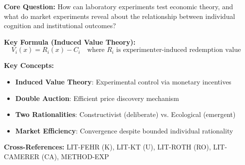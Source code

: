 \begin{abstract}
Vernon Smith (Nobel Prize 2002) pioneered experimental economics as a rigorous
methodology for testing economic theory. This appendix integrates his 60+ years
of research on market experiments, induced value theory, asset bubbles, and the
two-rationalities framework (constructivist vs. ecological) into EBF. Smith's
work provides the methodological foundation for laboratory validation of behavioral
predictions and demonstrates how market institutions generate emergent efficiency
even when individual rationality is limited.
\end{abstract}

\begin{tcolorbox}[colback=blue!5!white, colframe=blue!75!black,
    title=Quick Reference: LIT-SMITH]

\textbf{Core Question:} How can laboratory experiments test economic theory, and
what do market experiments reveal about the relationship between individual
cognition and institutional outcomes?

\textbf{Key Formula (Induced Value Theory):}
\begin{equation}
V_i(x) = R_i(x) - C_i \quad \text{where } R_i \text{ is experimenter-induced redemption value}
\label{eq:vs-induced-value}
\end{equation}

\textbf{Key Concepts:}
\begin{itemize}[nosep]
\item \textbf{Induced Value Theory}: Experimental control via monetary incentives
\item \textbf{Double Auction}: Efficient price discovery mechanism
\item \textbf{Two Rationalities}: Constructivist (deliberate) vs. Ecological (emergent)
\item \textbf{Market Efficiency}: Convergence despite bounded individual rationality
\end{itemize}

\textbf{Cross-References:} LIT-FEHR (K), LIT-KT (U), LIT-ROTH (RO), LIT-CAMERER (CA), METHOD-EXP
\end{tcolorbox}


